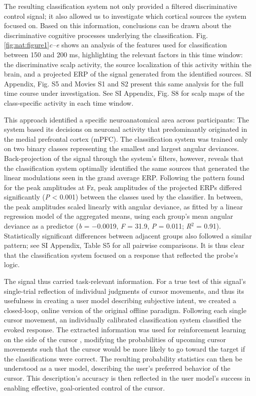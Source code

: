 The resulting classification system not only provided a filtered discriminative control signal; it also allowed us to investigate which cortical sources the system focused on. Based on this information, conclusions can be drawn about the discriminative cognitive processes underlying the classification. Fig. \ref{fig:nat:figure1}\emph{c–e} shows an analysis of the features used for classification between 150 and 200 ms, highlighting the relevant factors in this time window: the discriminative scalp activity, the source localization of this activity within the brain, and a projected ERP of the signal generated from the identified sources. SI Appendix, Fig. S5 and Movies S1 and S2 present this same analysis for the full time course under investigation. See SI Appendix, Fig. S8 for scalp maps of the class-specific activity in each time window.

This approach identified a specific neuroanatomical area across participants: The system based its decisions on neuronal activity that predominantly originated in the medial prefrontal cortex (mPFC). The classification system was trained only on two binary classes representing the smallest and largest angular deviances. Back-projection of the signal through the system's filters, however, reveals that the classification system optimally identified the same sources that generated the linear modulations seen in the grand average ERP. Following the pattern found for the peak amplitudes at Fz, peak amplitudes of the projected ERPs differed significantly (\textit{P} < 0.001) between the classes used by the classifier. In between, the peak amplitudes scaled linearly with angular deviance, as fitted by a linear regression model of the aggregated means, using each group's mean angular deviance as a predictor (\textit{b} = −0.0019, \textit{F} = 31.9, \textit{P} = 0.011; \textit{R$^{2}$} = 0.91). Statistically significant differences between adjacent groups also followed a similar pattern; see SI Appendix, Table S5 for all pairwise comparisons. It is thus clear that the classification system focused on a response that reflected the probe's logic.

The signal thus carried task-relevant information. For a true test of this signal's single-trial reflection of individual judgments of cursor movements, and thus its usefulness in creating a user model describing subjective intent, we created a closed-loop, online version of the original offline paradigm. Following each single cursor movement, an individually calibrated classification system classified the evoked response. The extracted information was used for reinforcement learning on the side of the cursor \cite{sutton1998reinforcementlearning}, modifying the probabilities of upcoming cursor movements such that the cursor would be more likely to go toward the target if the classifications were correct. The resulting probability statistics can then be understood as a user model, describing the user's preferred behavior of the cursor. This description's accuracy is then reflected in the user model's success in enabling effective, goal-oriented control of the cursor.

